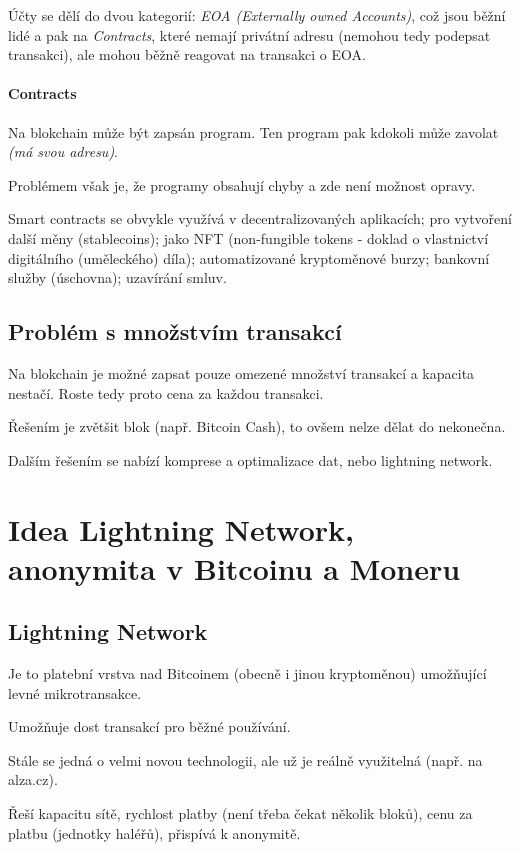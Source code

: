 \documentclass[10pt,a4paper]{article}
\begin{document}
Účty se dělí do dvou kategorií: \textit{EOA (Externally owned Accounts)}, což jsou běžní lidé a pak na \textit{Contracts}, které nemají privátní adresu (nemohou tedy podepsat transakci), ale mohou běžně reagovat na transakci o EOA.

\paragraph{Contracts}

Na blokchain může být zapsán program. Ten program pak kdokoli může zavolat \textit{(má svou adresu)}.


Problémem však je, že programy obsahují chyby a zde není možnost opravy.

Smart contracts se obvykle využívá v decentralizovaných aplikacích; pro vytvoření další měny (stablecoins); jako NFT (non-fungible tokens - doklad o vlastnictví digitálního (uměleckého) díla); automatizované kryptoměnové burzy; bankovní služby (úschovna); uzavírání smluv.

\subsection{Problém s množstvím transakcí}

Na blokchain je možné zapsat pouze omezené množství transakcí a kapacita nestačí. 
Roste tedy proto cena za každou transakci.

Řešením je zvětšit blok (např. Bitcoin Cash), to ovšem nelze dělat do nekonečna. 

Dalším řešením se nabízí komprese a optimalizace dat, nebo lightning network.

\section{Idea Lightning Network, anonymita v Bitcoinu a Moneru}

\subsection{Lightning Network}
Je to platební vrstva nad Bitcoinem (obecně i jinou kryptoměnou) umožňující levné mikrotransakce.

Umožňuje dost transakcí pro běžné používání.

Stále se jedná o velmi novou technologii, ale už je reálně využitelná (např. na alza.cz).

Řeší kapacitu sítě, rychlost platby (není třeba čekat několik bloků), cenu za platbu (jednotky haléřů), přispívá k anonymitě.
\end{document}
